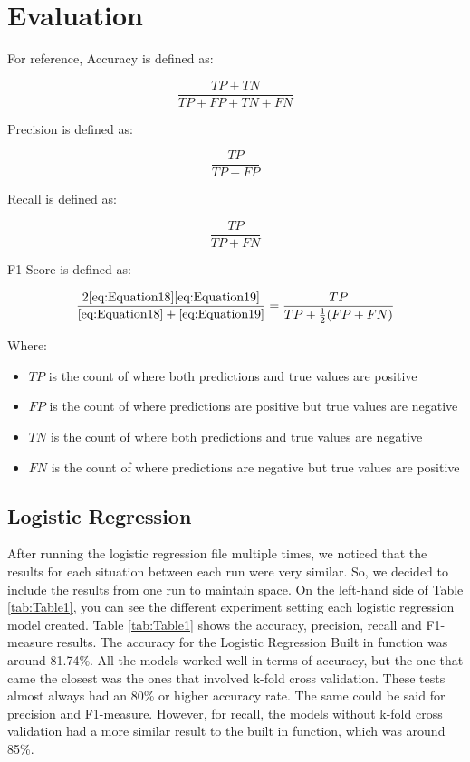 \section{Evaluation}
\label{sec:evaluation}

For reference, Accuracy is defined as:

\begin{equation}
    \label{eq:Equation17}
    \dfrac{TP + TN}{TP + FP + TN + FN}
\end{equation}

Precision is defined as:

\begin{equation}
    \label{eq:Equation18}
    \dfrac{TP}{TP + FP}
\end{equation}

Recall is defined as:

\begin{equation}
    \label{eq:Equation19}
    \dfrac{TP}{TP + FN}
\end{equation}

F1-Score is defined as:

\begin{equation}
    \label{eq:Equation20}
    \dfrac{2\eqref{eq:Equation18}\eqref{eq:Equation19}}{\eqref{eq:Equation18} + \eqref{eq:Equation19}} = \dfrac{TP}{TP + \frac{1}{2}(FP + FN)}
\end{equation}

Where:
\begin{itemize}
    \item $TP$ is the count of where both predictions and true values are positive
    \item $FP$ is the count of where predictions are positive but true values are negative
    \item $TN$ is the count of where both predictions and true values are negative
    \item $FN$ is the count of where predictions are negative but true values are positive
\end{itemize}

\subsection{Logistic Regression}
\label{sec:evaluation:Logistic Regression}
After running the logistic regression file multiple times, we noticed that the results for each situation between each run were very similar. So, we decided to include the results from one run to maintain space. On the left-hand side of Table \ref{tab:Table1}, you can see the different experiment setting each logistic regression model created. Table \ref{tab:Table1} shows the accuracy, precision, recall and F1-measure results. The accuracy for the Logistic Regression Built in function was around 81.74\%. All the models worked well in terms of accuracy, but the one that came the closest was the ones that involved k-fold cross validation. These tests almost always had an 80\% or higher accuracy rate. The same could be said for precision and F1-measure. However, for recall, the models without k-fold cross validation had a more similar result to the built in function, which was around 85\%.\\


